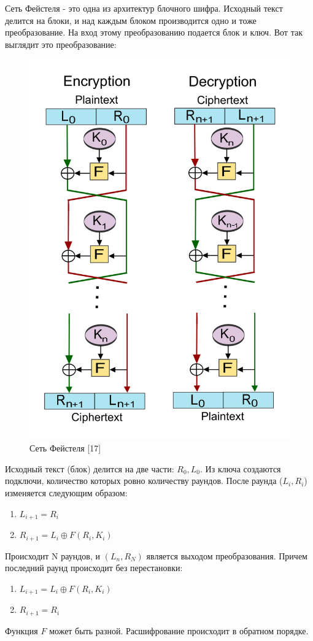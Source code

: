 \documentclass[colorthm]{./civarticle}
\begin{document}
\begin{definition}
  Сеть Фейстеля - это одна из архитектур блочного шифра. Исходный текст делится на блоки, и над каждым блоком производится одно и тоже преобразование. На вход этому преобразованию подается блок и ключ. Вот так выглядит это преобразование: 

  \begin{figure}[H]
      \centering
      \includegraphics[width=0.5\linewidth]{800px-Feistel_cipher_diagram_en.svg.png}
      \caption{Сеть Фейстеля [17]}
      \label{fig:enter-label}
  \end{figure}

    Исходный текст (блок) делится на две части: $R_0, L_0$. Из ключа создаются подключи, количество которых ровно количеству раундов. После раунда ($L_i, R_i$) изменяется следующим образом:
    \begin{enumerate}
        \item $L_{i+1} = R_i$
        \item $R_{i+1} = L_i \oplus F(R_i, K_i)$
    \end{enumerate}

    Происходит N раундов, и $(L_n, R_N)$ является выходом преобразования. Причем последний раунд происходит без перестановки:

    \begin{enumerate}
        \item $L_{i+1} = L_i \oplus F(R_i, K_i)$
        \item $R_{i+1} = R_i$
    \end{enumerate}
    
    Функция $F$ может быть разной. Расшифрование происходит в обратном порядке.
  
\end{definition}
\end{document}
